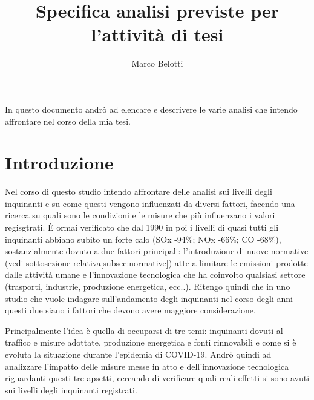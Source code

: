 \documentclass{article}
\title{Specifica analisi previste per l'attività di tesi}
\author{Marco Belotti}
\begin{document}
\maketitle
\tableofcontents
\listoftodos
\newpage

In questo documento andrò ad elencare e descrivere le varie analisi che intendo affrontare nel corso della mia tesi. 


\section{Introduzione}
\label{sec:introduzione}
Nel corso di questo studio intendo affrontare delle analisi sui livelli degli inquinanti e su come questi vengono influenzati da diversi fattori, facendo una ricerca su quali sono le condizioni e le misure che più influenzano i valori regisgtrati. È ormai verificato che dal 1990 in poi i livelli di quasi tutti gli inquinanti abbiano subito un forte calo (SOx -94\%; NOx -66\%; CO -68\%)\cite{iir2020}, sostanzialmente dovuto a due fattori principali: l'introduzione di nuove normative (vedi sottosezione relativa\ref{subsec:normative})
atte a limitare le emissioni prodotte dalle attività umane e l'innovazione tecnologica che ha coinvolto qualsiasi settore (trasporti, industrie, produzione energetica, ecc..). Ritengo quindi che in uno studio che vuole indagare sull'andamento degli inquinanti nel corso degli anni questi due siano i fattori che devono avere maggiore considerazione.

Principalmente l'idea è quella di occuparsi di tre temi: inquinanti dovuti al traffico e misure adottate, produzione energetica e fonti rinnovabili e come si è evoluta la situazione durante l'epidemia di COVID-19. Andrò quindi ad analizzare l'impatto delle misure messe in atto e dell'innovazione tecnologica riguardanti questi tre apsetti, cercando di verificare quali reali effetti si sono avuti sui livelli degli inquinanti registrati.
\end{document}
